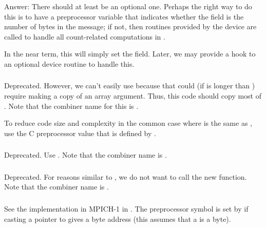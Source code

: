 \documentclass{article}
\begin{document}
Answer: There should at least be an optional one.  Perhaps the right
way to do this is to have a preprocessor variable that indicates
whether the  field is the number of bytes in
the message; if not, then routines provided by the device are called
to handle all count-related computations in .

In the near term, this will simply set the  field.  Later,
we may provide a hook to an optional device routine to handle this.

\subsubsection{}
Deprecated.  However, we can't easily use 
because that could (if  is longer than ) require
making a copy of an array argument.  Thus, this code should copy most
of .  Note that the combiner name for this
is .

To reduce code size and complexity in the common case where
 is the same as , use the
C preprocessor value  that is defined by
.  

\subsubsection{}
Deprecated.  Use .  Note that the combiner
name is .

\subsubsection{}
Deprecated.  For reasons similar to , we do
not want to call the new function.  Note that the combiner name is
. 

\subsubsection{}
See the implementation in MPICH-1  in
. 
The preprocessor symbol  is set by
 if casting a  pointer to 
gives a byte address (this assumes that a  is a byte). 
\end{document}
